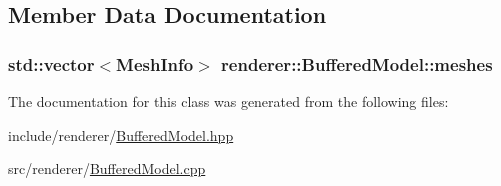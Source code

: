 \subsection{Member Data Documentation}
\hypertarget{classrenderer_1_1BufferedModel_a68d483bfd255bd335108ddd7da2496b2}{
\subsubsection[{meshes}]{\setlength{\rightskip}{0pt plus 5cm}std\-::vector$<${\bf Mesh\-Info}$>$ renderer\-::\-Buffered\-Model\-::meshes}}\label{classrenderer_1_1BufferedModel_a68d483bfd255bd335108ddd7da2496b2}


The documentation for this class was generated from the following files\-:\begin{DoxyCompactItemize}
\item 
include/renderer/\hyperlink{BufferedModel_8hpp}{Buffered\-Model.\-hpp}\item 
src/renderer/\hyperlink{BufferedModel_8cpp}{Buffered\-Model.\-cpp}\end{DoxyCompactItemize}
